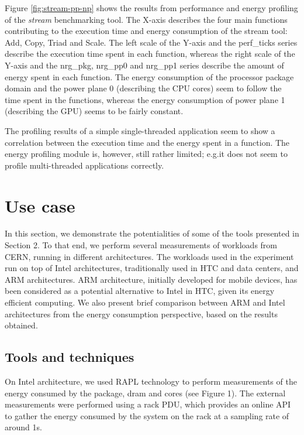 \documentclass[a4paper]{jpconf}
\begin{document}
Figure \ref{fig:stream-pp-np} shows the results from performance and energy profiling of the \emph{stream} benchmarking tool. The X-axis describes the four main functions contributing to the execution time and energy consumption of the stream tool: Add, Copy, Triad and Scale. The left scale of the Y-axis and the perf\_ticks series describe the execution time spent in each function, whereas the right scale of the Y-axis and the nrg\_pkg, nrg\_pp0 and nrg\_pp1 series describe the amount of energy spent in each function. The energy consumption of the processor package domain and the power plane 0 (describing the CPU cores) seem to follow the time spent in the functions, whereas the energy consumption of power plane 1 (describing the GPU) seems to be fairly constant. \cite{stream-web}

The profiling results of a simple single-threaded application seem to show a correlation between the execution time and the energy spent in a function. The energy profiling module is, however, still rather limited; e.g.\@ it does not seem to profile multi-threaded applications correctly. 

\section{Use case}
In this section, we demonstrate the potentialities of some of the tools 
presented in Section 2. To that end, we perform several measurements of workloads
from CERN, running in different architectures. The workloads used in the 
experiment run on top of Intel architectures, traditionally used in HTC and data
 centers, and ARM architectures. ARM architecture, initially developed for mobile
 devices, has been considered \cite{ACAT13ARM, CHEP13ARMPHI} as a potential 
alternative to Intel in HTC, given its energy efficient computing. We also 
present brief comparison between ARM and Intel architectures from the energy
consumption perspective, based on the results obtained. \\

\subsection{Tools and techniques}
On Intel architecture, we used RAPL technology to
perform measurements of the energy consumed by the package, dram and cores (see
Figure 1). The external measurements were performed using a rack PDU, which 
provides an online API to gather the energy consumed by the system on the rack 
at a sampling rate of around 1s.
\end{document}
